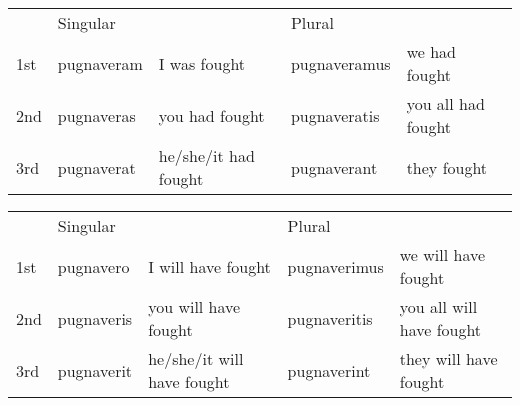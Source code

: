 \begin{center}  
  \begin{tabular}{lllll}
    \centering
    & Singular & & Plural &  \\
    1st & pugnaveram & I was fought & pugnaveramus & we had fought \\
    2nd & pugnaveras & you had fought & pugnaveratis & you all had fought \\ 
    3rd & pugnaverat & he/she/it had fought & pugnaverant & they fought \\
  \end{tabular}
\end{center}


\begin{center}  
  \begin{tabular}{lllll}
    \centering
    & Singular & & Plural &  \\
    1st & pugnavero & I will have fought & pugnaverimus & we will have fought \\
    2nd & pugnaveris & you will have fought & pugnaveritis & you all will have fought \\ 
    3rd & pugnaverit & he/she/it will have fought & pugnaverint & they will have fought \\
  \end{tabular}
\end{center}

